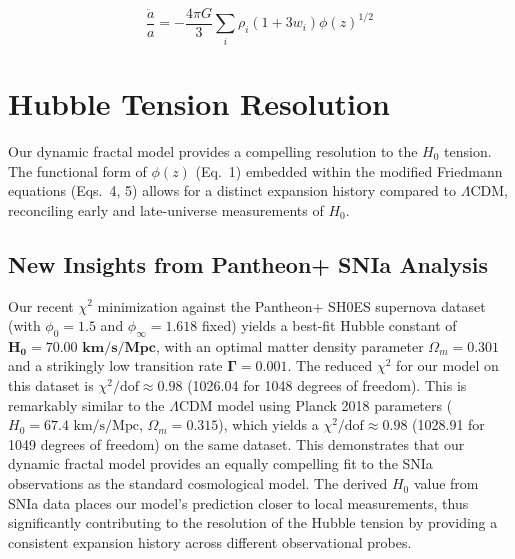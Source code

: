 \documentclass[aps,prl,twocolumn,groupedaddress]{revtex4-2}
\begin{document}
\begin{equation}
\frac{\ddot{a}}{a} = -\frac{4\pi G}{3}\sum_i \rho_i(1+3w_i)\phi(z)^{1/2}
\end{equation}

\section{Hubble Tension Resolution}
\label{sec:snia_analysis}

Our dynamic fractal model provides a compelling resolution to the $H_0$ tension. The functional form of $\phi(z)$ (Eq.~1) embedded within the modified Friedmann equations (Eqs.~4, 5) allows for a distinct expansion history compared to $\Lambda$CDM, reconciling early and late-universe measurements of $H_0$.

\subsection{New Insights from Pantheon+ SNIa Analysis}
Our recent $\chi^2$ minimization against the Pantheon+ SH0ES supernova dataset \cite{riess2021} (with $\phi_0=1.5$ and $\phi_\infty=1.618$ fixed) yields a best-fit Hubble constant of $\mathbf{H_0 = 70.00 \text{ km/s/Mpc}}$, with an optimal matter density parameter $\Omega_m = 0.301$ and a strikingly low transition rate $\mathbf{\Gamma = 0.001}$.
The reduced $\chi^2$ for our model on this dataset is $\chi^2/\text{dof} \approx 0.98$ (1026.04 for 1048 degrees of freedom). This is remarkably similar to the $\Lambda$CDM model using Planck 2018 parameters ($H_0 = 67.4 \text{ km/s/Mpc}$, $\Omega_m = 0.315$), which yields a $\chi^2/\text{dof} \approx 0.98$ (1028.91 for 1049 degrees of freedom) on the same dataset. This demonstrates that our dynamic fractal model provides an equally compelling fit to the SNIa observations as the standard cosmological model. The derived $H_0$ value from SNIa data places our model's prediction closer to local measurements, thus significantly contributing to the resolution of the Hubble tension by providing a consistent expansion history across different observational probes.
\end{document}
